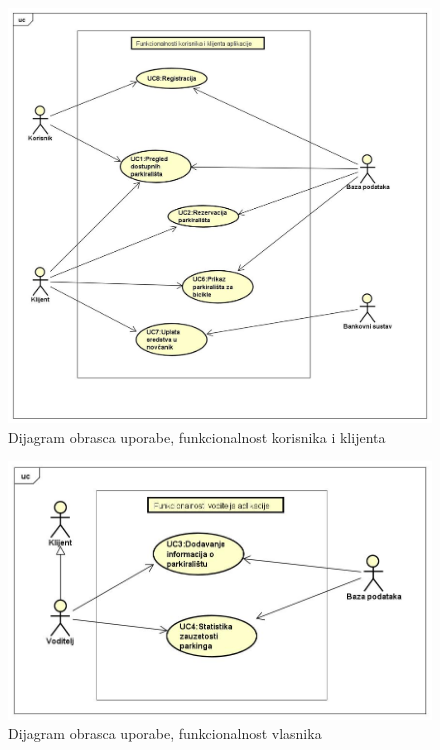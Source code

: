 \begin{figure}[!htb]
	\centering
	\includegraphics[width=1\linewidth]{dijagrami/dijagramKlijent.jpg}
	\caption{ Dijagram obrasca uporabe, funkcionalnost korisnika i klijenta}
	\label{fig:dijagramklijent}
	
\end{figure}

\begin{figure}[!htb]
	\centering
	\includegraphics[width=1\linewidth]{dijagrami/dijagramVoditelj}
	\caption{Dijagram obrasca uporabe, funkcionalnost vlasnika}
	\label{fig:dijagramvoditelj}
\end{figure}

